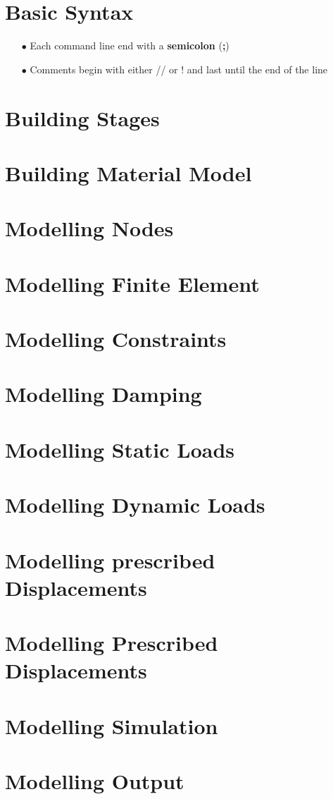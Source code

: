 \documentclass{article}
\begin{document}



\section {Basic Syntax}

\begin{itemize}
\item[$\bullet$]Each command line end with a \textbf{semicolon} (\textbf{;})
\item[$\bullet$]Comments begin with either // or ! and last until the end of the line
\end{itemize}

\section {Building Stages}
\section {Building Material Model}
\section {Modelling Nodes}
\section {Modelling Finite Element}
\section {Modelling Constraints}
\section {Modelling Damping}
\section {Modelling Static Loads}
\section {Modelling Dynamic Loads}
\section {Modelling prescribed Displacements}
\section {Modelling Prescribed Displacements}
\section {Modelling Simulation}
\section {Modelling Output}
\end{document}
